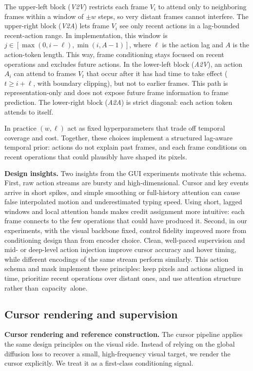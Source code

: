 The upper-left block (\emph{V2V}) restricts each frame $V_i$ to attend only to neighboring frames within a window of $\pm w$ steps, so very distant frames cannot interfere.
The upper-right block (\emph{V2A}) lets frame $V_i$ see only recent actions in a lag-bounded recent-action range.
In implementation, this window is $j \in [\max(0, i-\ell), \min(i, A-1)]$, where $\ell$ is the action lag and $A$ is the action-token length.
This way, frame conditioning stays focused on recent operations and excludes future actions.
In the lower-left block (\emph{A2V}), an action $A_i$ can attend to frames $V_t$ that occur after it has had time to take effect ($t \ge i+\ell$, with boundary clipping), but not to earlier frames.
This path is representation-only and does not expose future frame information to frame prediction.
The lower-right block (\emph{A2A}) is strict diagonal: each action token attends to itself.

In practice $(w,\ell)$ act as fixed hyperparameters that trade off temporal coverage and cost.
Together, these choices implement a structured lag-aware temporal prior: actions do not explain past frames, and each frame conditions on recent operations that could plausibly have shaped its pixels.

\noindent\textbf{Design insights.} Two insights from the GUI experiments motivate this schema.
First, raw action streams are bursty and high-dimensional.
Cursor and key events arrive in short spikes, and simple smoothing or full-history attention can cause false interpolated motion and underestimated typing speed.
Using short, lagged windows and local attention bands makes credit assignment more intuitive: each frame connects to the few operations that could have produced it.
Second, in our experiments, with the visual backbone fixed, control fidelity improved more from conditioning design than from encoder choice.
Clean, well-paced supervision and mid- or deep-level action injection improve cursor accuracy and hover timing, while different encodings of the same stream perform similarly.
This action schema and mask implement these principles: keep pixels and actions aligned in time, prioritize recent operations over distant ones, and use attention structure rather than~capacity~alone.

\subsection{Cursor rendering and supervision}
\noindent\textbf{Cursor rendering and reference construction.}
\label{appendix:cursor-rendering} 
The cursor pipeline applies the same design principles on the visual side.
Instead of relying on the global diffusion loss to recover a small, high-frequency visual target, we render the cursor explicitly.
We treat it as a first-class conditioning signal.

